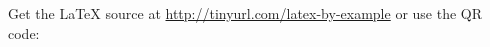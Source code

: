 \documentclass{article}
\begin{document}
\pagestyle{empty}

\noindent
\large{Get the LaTeX source at \url{http://tinyurl.com/latex-by-example} or use the QR code:}
\hfill
{}%

\inputminted[linenos,frame=single, bgcolor=bg, fontsize=\footnotesize, breaklines]{latex}{latex-by-example.tex} %
\end{document}
